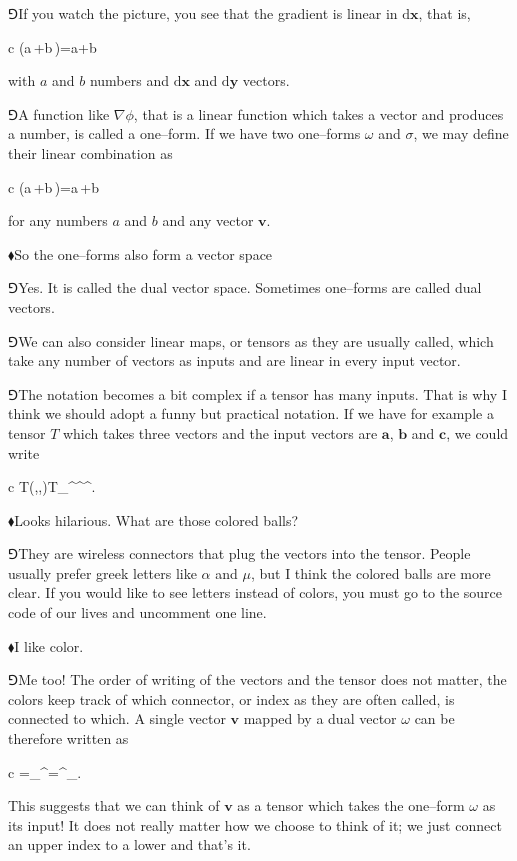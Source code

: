 \documentclass[11pt,oneside%
]{memoir}
\newenvironment{eqna}{\begin{IEEEeqnarray*}{c}}{\end{IEEEeqnarray*}\ignorespacesafterend}
\newcommand{\dd}{\mathrm{d}}
\renewcommand{\vec}[1]{\mathbf{#1}}
\newcommand{\tensa}[2]{#1_{#2}}
\newcommand{\hea}{\(\blacklozenge\)\;}
\newcommand{\heb}{\(\Game\)\;}
\newcommand{\coa}{{\color{black}\bullet}}
\newcommand{\cob}{{\color{oranssi}\bullet}}
\newcommand{\coc}{{\color{cyan}\bullet}}
\begin{document}

\heb If you watch the picture, you see that the gradient is linear in \(\dd\vec{x}\), that is,
\begin{eqna}
    \nabla\phi\cdot(a\,\dd\vec{x}+b\,\dd\vec{y})=a\nabla\phi\cdot\dd\vec{x}+b\nabla\phi\cdot\dd\vec{y}
\end{eqna}
with \(a\) and \(b\) numbers and \(\dd\vec{x}\) and \(\dd\vec{y}\) vectors.

\heb A function like \(\nabla\phi\), that is a linear function which takes a vector and produces a number, is called a one--form. If we have two one--forms \(\omega\) and \(\sigma\), we may define their linear combination as
\begin{eqna}
    (a\,\omega+b\,\sigma)\cdot\vec{x}=a\,\omega\cdot\vec{v}+b\,\sigma\cdot\vec{v}
\end{eqna}
for any numbers \(a\) and \(b\) and any vector \(\vec{v}\).

\hea So the one--forms also form a vector space

\heb Yes. It is called the dual vector space. Sometimes one--forms are called dual vectors.

\heb We can also consider linear maps, or tensors as they are usually called, which take any number of vectors as inputs and are linear in every input vector.

\heb The notation becomes a bit complex if a tensor has many inputs. That is why I think we should adopt a funny but practical notation. If we have for example a tensor \(T\) which takes three vectors and the input vectors are \(\vec{a}\), \(\vec{b}\) and \(\vec{c}\), we could write
\begin{eqna}
    T(\vec{a},\vec{b},\vec{c})\doteq\tensa{T}{\coa\cob\coc}\vec{a}^\coa\vec{b}^\cob\vec{c}^\coc.
\end{eqna}

\hea Looks hilarious. What are those colored balls?

\heb They are wireless connectors that plug the vectors into the tensor. People usually prefer greek letters like \(\alpha\) and \(\mu\), but I think the colored balls are more clear. If you would like to see letters instead of colors, you must go to the source code of our lives and uncomment one line.

\hea I like color.

\heb Me too! The order of writing of the vectors and the tensor does not matter, the colors keep track of which connector, or index as they are often called, is connected to which. A single vector \(\vec{v}\) mapped by a dual vector \(\omega\) can be therefore written as
\begin{eqna}
    \omega\cdot\vec{v}=\omega_\coa\vec{v}^\coa=\vec{v}^\coa\omega_\coa.
\end{eqna}
This suggests that we can think of \(\vec{v}\) as a tensor which takes the one--form \(\omega\) as its input! It does not really matter how we choose to think of it; we just connect an upper index to a lower and that's it.
\end{document}

